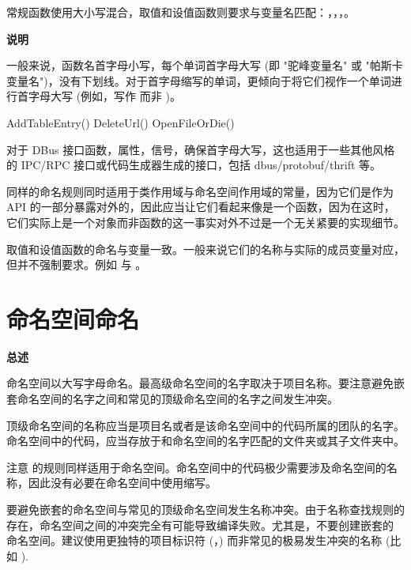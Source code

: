 常规函数使用大小写混合，取值和设值函数则要求与变量名匹配：，，，。

\textbf{说明}

一般来说，函数名首字母小写，每个单词首字母大写 (即 "驼峰变量名" 或 "帕斯卡变量名")，没有下划线。对于首字母缩写的单词，更倾向于将它们视作一个单词进行首字母大写 (例如，写作  而非 )。

\begin{cppcode}
  AddTableEntry()
  DeleteUrl()
  OpenFileOrDie()
\end{cppcode}

\begin{DWarn}
  对于 DBus 接口函数，属性，信号，确保首字母大写，这也适用于一些其他风格的 IPC/RPC 接口或代码生成器生成的接口，包括 dbus/protobuf/thrift 等。
\end{DWarn}

同样的命名规则同时适用于类作用域与命名空间作用域的常量，因为它们是作为 API 的一部分暴露对外的，因此应当让它们看起来像是一个函数，因为在这时，它们实际上是一个对象而非函数的这一事实对外不过是一个无关紧要的实现细节。

取值和设值函数的命名与变量一致。一般来说它们的名称与实际的成员变量对应，但并不强制要求。例如  与 。

\section{命名空间命名} \label{qt-namespace-names}

\textbf{总述}
\begin{DWarn}
  命名空间以大写字母命名。最高级命名空间的名字取决于项目名称。要注意避免嵌套命名空间的名字之间和常见的顶级命名空间的名字之间发生冲突。
\end{DWarn}

顶级命名空间的名称应当是项目名或者是该命名空间中的代码所属的团队的名字。命名空间中的代码，应当存放于和命名空间的名字匹配的文件夹或其子文件夹中。

注意  的规则同样适用于命名空间。命名空间中的代码极少需要涉及命名空间的名称，因此没有必要在命名空间中使用缩写。

要避免嵌套的命名空间与常见的顶级命名空间发生名称冲突。由于名称查找规则的存在，命名空间之间的冲突完全有可能导致编译失败。尤其是，不要创建嵌套的  命名空间。建议使用更独特的项目标识符 (，) 而非常见的极易发生冲突的名称 (比如 ).

